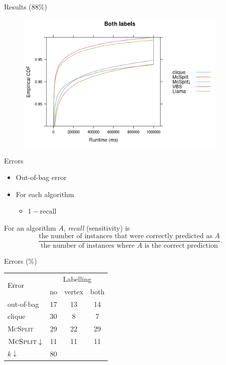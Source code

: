 \documentclass{beamer}
\begin{document}
\begin{frame}{Results (88\%)}
  \begin{figure}
    \centering
    \includegraphics[width=0.9\textwidth]{../dissertation/images/ecdf_both_labels_llama.png}
  \end{figure}
\end{frame}

\begin{frame}{Errors}
  \begin{itemize}
  \item Out-of-bag error
  \item For each algorithm
    \begin{itemize}
    \item $1 - \text{recall}$
    \end{itemize}
  \end{itemize}
  \begin{definition}
    For an algorithm $A$, \emph{recall} (sensitivity) is
    \[ \frac{\text{the number of instances that were correctly predicted as
          $A$}}{\text{the number of instances where $A$ is the correct
          prediction}}. \]
  \end{definition}
\end{frame}

\begin{frame}{Errors (\%)}
  \centering
  \begin{tabular}{l c c c}
    \toprule
    \multirow{2}{*}{Error} & \multicolumn{3}{c}{Labelling} \\
    \cmidrule(lr){2-4}
                           & no & vertex & both \\
    \midrule
    out-of-bag & 17 & 13 & 14 \\
    clique & 30 & 8 & 7 \\
    \textsc{McSplit} & 29 & 22 & 29 \\
    $\textsc{McSplit}\downarrow$ & 11 & 11 & 11 \\
    $k\downarrow$ & 80 & & \\
    \bottomrule
  \end{tabular}
\end{frame}
\end{document}
